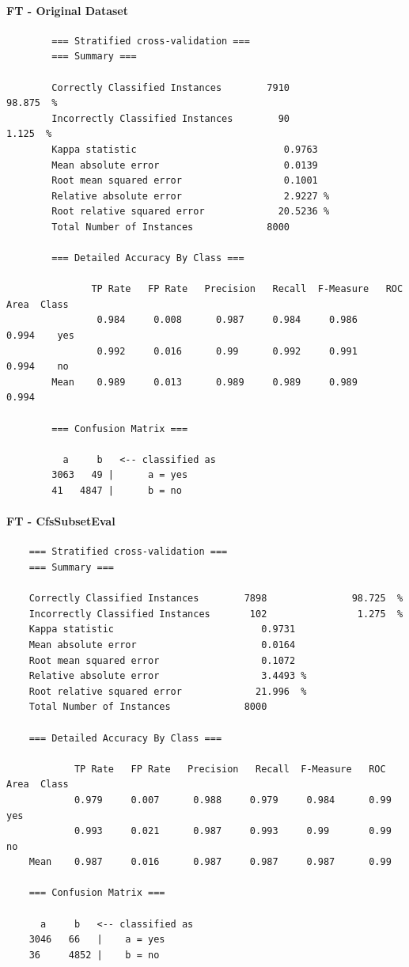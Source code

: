 \paragraph{FT - Original Dataset}
{\footnotesize
	\begin{verbatim}
		=== Stratified cross-validation ===
		=== Summary ===
		
		Correctly Classified Instances        7910               98.875  %
		Incorrectly Classified Instances        90                1.125  %
		Kappa statistic                          0.9763
		Mean absolute error                      0.0139
		Root mean squared error                  0.1001
		Relative absolute error                  2.9227 %
		Root relative squared error             20.5236 %
		Total Number of Instances             8000     
		
		=== Detailed Accuracy By Class ===
		
		       TP Rate   FP Rate   Precision   Recall  F-Measure   ROC Area  Class
		        0.984     0.008      0.987     0.984     0.986      0.994    yes
		        0.992     0.016      0.99      0.992     0.991      0.994    no
		Mean    0.989     0.013      0.989     0.989     0.989      0.994
		
		=== Confusion Matrix ===
		
		  a     b   <-- classified as
		3063   49 |      a = yes
		41   4847 |      b = no
	\end{verbatim}
}

\paragraph{FT - CfsSubsetEval}
{\footnotesize
	\begin{verbatim}
	=== Stratified cross-validation ===
	=== Summary ===
	
	Correctly Classified Instances        7898               98.725  %
	Incorrectly Classified Instances       102                1.275  %
	Kappa statistic                          0.9731
	Mean absolute error                      0.0164
	Root mean squared error                  0.1072
	Relative absolute error                  3.4493 %
	Root relative squared error             21.996  %
	Total Number of Instances             8000     
	
	=== Detailed Accuracy By Class ===
	
	        TP Rate   FP Rate   Precision   Recall  F-Measure   ROC Area  Class
	        0.979     0.007      0.988     0.979     0.984      0.99     yes
	        0.993     0.021      0.987     0.993     0.99       0.99     no
	Mean    0.987     0.016      0.987     0.987     0.987      0.99 
	
	=== Confusion Matrix ===
	
	  a     b   <-- classified as
	3046   66   |    a = yes
	36     4852 |    b = no
	\end{verbatim}
}

